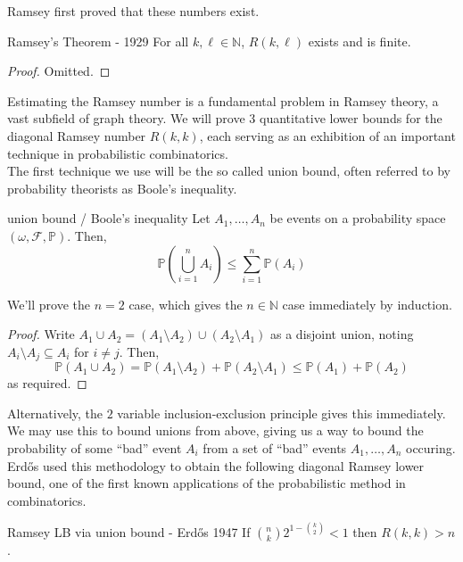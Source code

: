 \documentclass{article}
\begin{document}
Ramsey first proved that these numbers exist. 

\begin{theorem}[]{Ramsey's Theorem - 1929}
    For all $k, \ell \in \mathbb{N}$, $R(k, \ell)$ exists and is finite. 
\end{theorem}

\begin{proof}
    Omitted. 
\end{proof}

Estimating the Ramsey number is a fundamental problem in Ramsey theory, a vast subfield of graph theory. We 
will prove 3 quantitative lower bounds for the diagonal Ramsey number $R(k, k)$, each serving as an exhibition 
of an important technique in probabilistic combinatorics. \\ 

The first technique we use will be the so called union bound, often referred to by probability theorists as 
Boole's inequality. 

\begin{lemma}[]{union bound / Boole's inequality}
    Let $A_1, \dots, A_n$ be events on a probability space $(\omega, \mathcal{F}, \mathbb{P})$. Then, 
    \[\mathbb{P}\left(\bigcup_{i = 1}^n A_i\right) \leq \sum_{i = 1}^n \mathbb{P}(A_i)\]
\end{lemma}

We'll prove the $n=2$ case, which gives the $n \in \mathbb{N}$ case immediately by induction. 

\begin{proof}
    Write $A_1 \cup A_2 = (A_1 \setminus A_2) \cup (A_2 \setminus A_1)$ as a disjoint union, noting $A_i \setminus A_j 
    \subseteq A_i$ for $i \neq j$. Then,
    \[\mathbb{P}(A_1 \cup A_2) = \mathbb{P}(A_1 \setminus A_2) + \mathbb{P}(A_2 \setminus A_1) 
    \leq \mathbb{P}(A_1) + \mathbb{P}(A_2)\] as required.
\end{proof}

Alternatively, the $2$ variable inclusion-exclusion principle gives this immediately. \\ 

We may use this to bound unions from above, giving us a way to bound the probability of some ``bad'' event 
$A_i$ from a set of ``bad'' events $A_1, \dots, A_n$ occuring. Erd\H{o}s used this methodology to obtain the 
following diagonal Ramsey lower bound, one of the first known applications of the probabilistic method in combinatorics. 

\begin{proposition}[]{Ramsey LB via union bound - Erd\H{o}s 1947}
    If $\binom{n}{k}2^{1 - \binom{k}{2}} < 1$ then $R(k, k) > n$. 
\end{proposition}
\end{document}
